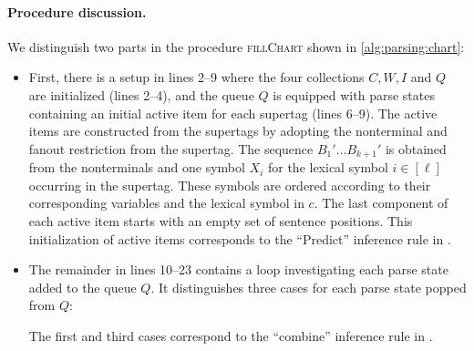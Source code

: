 \documentclass[../../document.tex]{subfiles}
\begin{document}
    \paragraph{Procedure discussion.} We distinguish two parts in the procedure \textsc{fillChart} shown in \cref{alg:parsing:chart}:
    \begin{itemize}
        \item First, there is a setup in lines 2--9 where the four collections \(C, W, I\) and \(Q\) are initialized (lines 2--4), and the queue \(Q\) is equipped with parse states containing an initial active item for each supertag (lines 6--9).
            The active items are constructed from the supertags by adopting the  nonterminal and fanout restriction from the supertag.
            The sequence \(B_1' \ldots B_{k+1}'\) is obtained from the  nonterminals and one symbol \(X_i\) for the lexical symbol \(i \in [\ell]\) occurring in the supertag.
            These symbols are ordered according to their corresponding variables and the lexical symbol in \(c\).
            The last component of each active item starts with an empty set of sentence positions.
            This initialization of active items corresponds to the ``Predict'' inference rule in .
        \item
            The remainder in lines 10--23 contains a loop investigating each parse state added to the queue \(Q\).
            It distinguishes three cases for each parse state popped from \(Q\):
            The first and third cases correspond to the ``combine'' inference rule in .
    \end{itemize}
\end{document}
